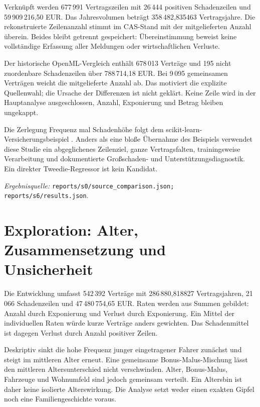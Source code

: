 \documentclass[11pt,a4paper]{article}
\newcommand{\evidence}[1]{\par{\footnotesize\textit{Ergebnisquelle:} \nolinkurl{#1}.}\par}
\begin{document}
Verknüpft werden 677\,991 Vertragszeilen mit 26\,444 positiven Schadenzeilen und 59\,909\,216,50 EUR. Das Jahresvolumen beträgt 358\,482,835463 Vertragsjahre. Die rekonstruierte Zeilenanzahl stimmt im CAS-Stand mit der mitgelieferten Anzahl überein. Beides bleibt getrennt gespeichert: Übereinstimmung beweist keine vollständige Erfassung aller Meldungen oder wirtschaftlichen Verluste.

Der historische OpenML-Vergleich enthält 678\,013 Verträge und 195 nicht zuordenbare Schadenzeilen über 788\,714,18 EUR. Bei 9\,095 gemeinsamen Verträgen weicht die mitgelieferte Anzahl ab. Das motiviert die explizite Quellenwahl; die Ursache der Differenzen ist nicht geklärt. Keine Zeile wird in der Hauptanalyse ausgeschlossen, Anzahl, Exponierung und Betrag bleiben ungekappt.

Die Zerlegung Frequenz mal Schadenhöhe folgt dem scikit-learn-Versicherungsbeispiel \cite{example}. Anders als eine bloße Übernahme des Beispiels verwendet diese Studie ein abgeglichenes Zeilenziel, ganze Vertragsfalten, trainingsweise Verarbeitung und dokumentierte Großschaden- und Unterstützungsdiagnostik. Ein direkter Tweedie-Regressor ist kein Kandidat.
\evidence{reports/s0/source_comparison.json; reports/s6/results.json}

\clearpage
\section{Exploration: Alter, Zusammensetzung und Unsicherheit}
Die Entwicklung umfasst 542\,392 Verträge mit 286\,880,818827 Vertragsjahren, 21\,066 Schadenzeilen und 47\,480\,754,65 EUR. Raten werden aus Summen gebildet: Anzahl durch Exponierung und Verlust durch Exponierung. Ein Mittel der individuellen Raten würde kurze Verträge anders gewichten. Das Schadenmittel ist dagegen Verlust durch Anzahl positiver Zeilen.

Deskriptiv sinkt die hohe Frequenz junger eingetragener Fahrer zunächst und steigt im mittleren Alter erneut. Eine gemeinsame Bonus-Malus-Mischung lässt den mittleren Altersunterschied nicht verschwinden. Alter, Bonus-Malus, Fahrzeuge und Wohnumfeld sind jedoch gemeinsam verteilt. Ein Altersbin ist daher keine isolierte Alterswirkung. Die Analyse setzt weder einen exakten Gipfel noch eine Familiengeschichte voraus.
\end{document}
